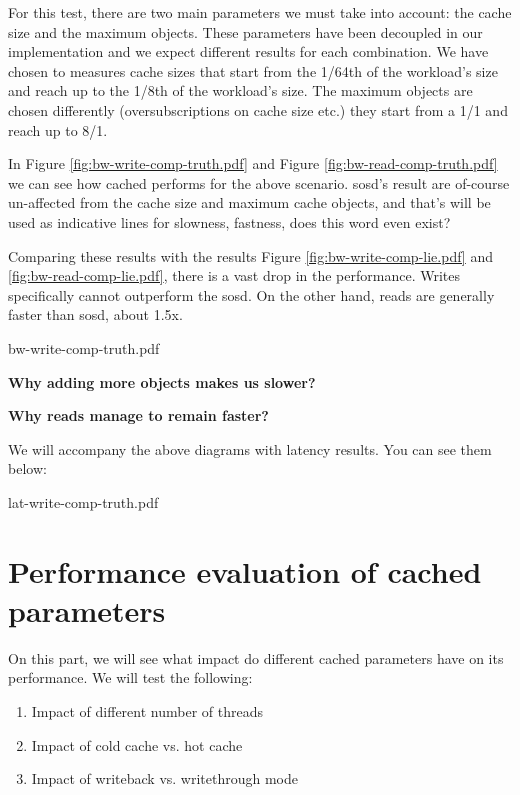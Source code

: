 For this test, there are two main parameters we must take into account: the 
cache size and the maximum objects. These parameters have been decoupled in our 
implementation and we expect different results for each combination. We have 
chosen to measures cache sizes that start from the 1/64th of the workload's 
size and reach up to the 1/8th of the workload's size. The maximum objects are 
chosen differently (oversubscriptions on cache size etc.) they start from a 1/1 
and reach up to 8/1.

In Figure \ref{fig:bw-write-comp-truth.pdf} and Figure 
\ref{fig:bw-read-comp-truth.pdf} we can see how cached performs for the above 
scenario. sosd's result are of-course un-affected from the cache size and 
maximum cache objects, and that's will be used as indicative lines for 
slowness, fastness, does this word even exist?

Comparing these results with the results Figure \ref{fig:bw-write-comp-lie.pdf} 
and \ref{fig:bw-read-comp-lie.pdf}, there is a vast drop in the performance. 
Writes specifically cannot outperform the sosd. On the other hand, reads are 
generally faster than sosd, about 1.5x.

{bw-write-comp-truth.pdf}

\textbf{Why adding more objects makes us slower?}

\textbf{Why reads manage to remain faster?}

We will accompany the above diagrams with latency results. You can see them 
below:

{lat-write-comp-truth.pdf}


\section{Performance evaluation of cached parameters}

On this part, we will see what impact do different cached parameters have on 
its performance. We will test the following:

\begin{enumerate}
	\item Impact of different number of threads
	\item Impact of cold cache vs. hot cache
	\item Impact of writeback vs. writethrough mode
\end{enumerate}

